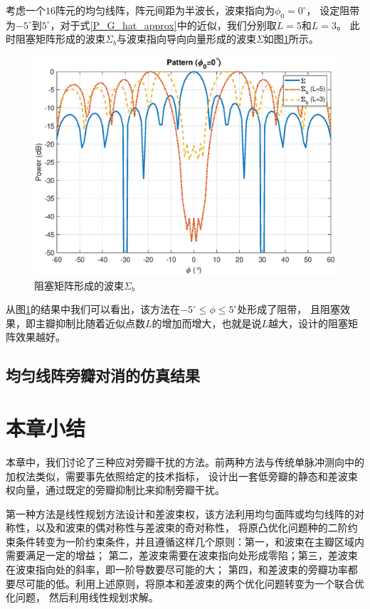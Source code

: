 \documentclass[master]{thesis-uestc}
\begin{document}
考虑一个$16$阵元的均匀线阵，阵元间距为半波长，波束指向为$\phi_0=0^\circ$，
设定阻带为$-5^\circ$到$5^\circ$，对于式\eqref{P_G_hat_approx}中的近似，我们分别取$L=5$和$L=3$。
此时阻塞矩阵形成的波束$\Sigma_b$与波束指向导向向量形成的波束$\Sigma$如图\ref{GSC_Block_dif_L}所示。
\begin{figure}[h]
    \includegraphics[scale=0.4]{pic/GSC_Block.eps}
    \caption{阻塞矩阵形成的波束$\Sigma_b$}
    \label{GSC_Block_dif_L}
\end{figure}

从图\ref{GSC_Block_dif_L}的结果中我们可以看出，该方法在$-5^\circ\le\phi\le5^\circ$处形成了阻带，
且阻塞效果，即主瓣抑制比随着近似点数$L$的增加而增大，也就是说$L$越大，设计的阻塞矩阵效果越好。

\subsection{均匀线阵旁瓣对消的仿真结果}

\section{本章小结}
本章中，我们讨论了三种应对旁瓣干扰的方法。前两种方法与传统单脉冲测向中的加权法类似，需要事先依照给定的技术指标，
设计出一套低旁瓣的静态和差波束权向量，通过既定的旁瓣抑制比来抑制旁瓣干扰。

第一种方法是线性规划方法设计和差波束权，该方法利用均匀面阵或均匀线阵的对称性，以及和波束的偶对称性与差波束的奇对称性，
将原凸优化问题种的二阶约束条件转变为一阶约束条件，并且遵循这样几个原则：第一，和波束在主瓣区域内需要满足一定的增益；
第二，差波束需要在波束指向处形成零陷；第三，差波束在波束指向处的斜率，即一阶导数要尽可能的大；
第四，和差波束的旁瓣功率都要尽可能的低。利用上述原则，将原本和差波束的两个优化问题转变为一个联合优化问题，
然后利用线性规划求解。
\end{document}
